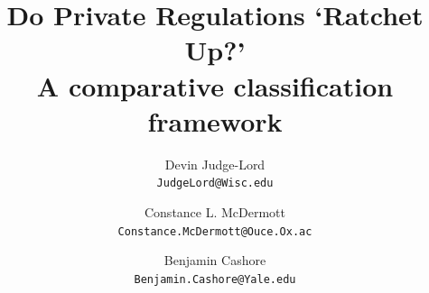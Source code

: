 \documentclass{article}
\title{Do Private Regulations `Ratchet Up?'\\
A comparative classification framework
}
\author{
Devin Judge-Lord\\
\texttt{JudgeLord@Wisc.edu}
\and
Constance L. McDermott\\
\texttt{Constance.McDermott@Ouce.Ox.ac}
\and
Benjamin Cashore\\
\texttt{Benjamin.Cashore@Yale.edu}
}
\begin{document}
\maketitle

\noindent

\begin{abstract}


\end{abstract}
\end{document}
